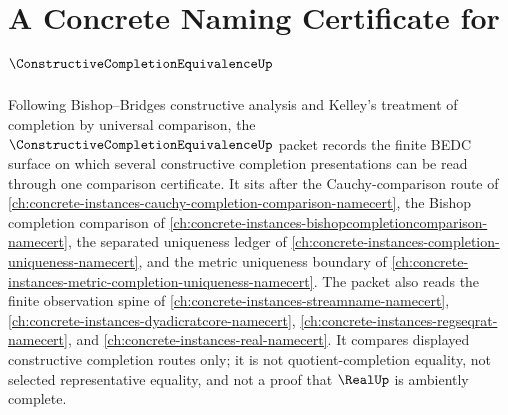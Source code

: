 \chapter{A Concrete Naming Certificate for $\ConstructiveCompletionEquivalenceUp$}
\label{ch:concrete-instances-constructive-completion-equivalence-namecert}

Following Bishop--Bridges constructive analysis and Kelley's treatment of completion by universal comparison, the $\ConstructiveCompletionEquivalenceUp$ packet records the finite BEDC surface on which several constructive completion presentations can be read through one comparison certificate. It sits after the Cauchy-comparison route of \autoref{ch:concrete-instances-cauchy-completion-comparison-namecert}, the Bishop completion comparison of \autoref{ch:concrete-instances-bishopcompletioncomparison-namecert}, the separated uniqueness ledger of \autoref{ch:concrete-instances-completion-uniqueness-namecert}, and the metric uniqueness boundary of \autoref{ch:concrete-instances-metric-completion-uniqueness-namecert}. The packet also reads the finite observation spine of \autoref{ch:concrete-instances-streamname-namecert}, \autoref{ch:concrete-instances-dyadicratcore-namecert}, \autoref{ch:concrete-instances-regseqrat-namecert}, and \autoref{ch:concrete-instances-real-namecert}. It compares displayed constructive completion routes only; it is not quotient-completion equality, not selected representative equality, and not a proof that $\RealUp$ is ambiently complete.

